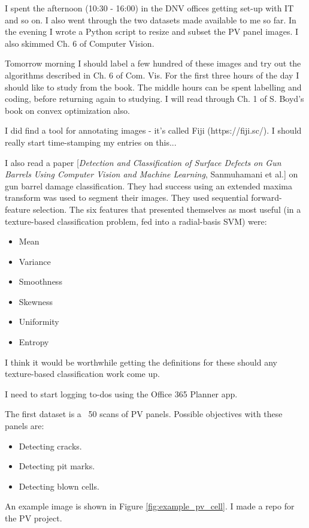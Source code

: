 \documentclass[idxtotoc,hyperref,openany]{labbook} %
\begin{document}
I spent the afternoon (10:30 - 16:00) in the DNV offices getting set-up with IT and so on. I also went through the two datasets made available to me so far. In the evening I wrote a Python script to resize and subset the PV panel images. I also skimmed Ch. 6 of Computer Vision.

Tomorrow morning I should label a few hundred of these images and try out the algorithms described in Ch. 6 of Com. Vis. For the first three hours of the day I should like to study from the book. The middle hours can be spent labelling and coding, before returning again to studying. I will read through Ch. 1 of S. Boyd's book on convex optimization also.

I did find a tool for annotating images - it's called Fiji (https://fiji.sc/). I should really start time-stamping my entries on this...

I also read a paper [\emph{Detection and Classification of Surface Defects on Gun Barrels Using Computer Vision and Machine Learning}, Sanmuhamani et al.] on gun barrel damage classification. They had success using an extended maxima transform was used to segment their images. They used sequential forward-feature selection. The six features that presented themselves as most useful (in a texture-based classification problem, fed into a radial-basis SVM) were:
\begin{itemize}
	\item Mean
	\item Variance
	\item Smoothness
	\item Skewness
	\item Uniformity
	\item Entropy
\end{itemize}
I think it would be worthwhile getting the definitions for these should any texture-based classification work come up.

I need to start logging to-dos using the Office 365 Planner app.

The first dataset is a ~50 scans of PV panels. Possible objectives with these panels are:
\begin{itemize}
	\item Detecting cracks.
	\item Detecting pit marks.
	\item Detecting blown cells.
\end{itemize}
An example image is shown in Figure \ref{fig:example_pv_cell}. I made a repo for the PV project.
\end{document}
